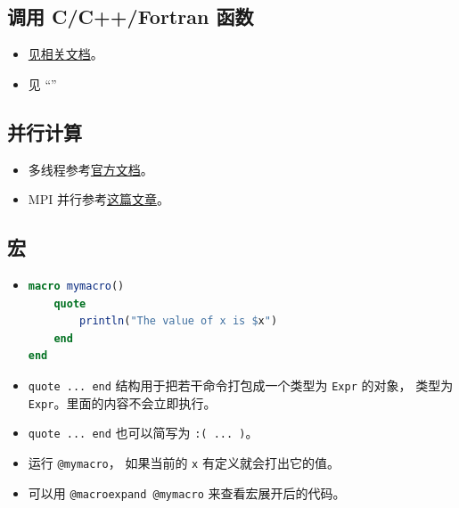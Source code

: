 \subsection{调用 C/C++/Fortran 函数}
\begin{itemize}
\item \href{https://docs.julialang.org/en/v1/manual/calling-c-and-fortran-code/}{见相关文档}。
\item 见 “”
\end{itemize}

\subsection{并行计算}
\begin{itemize}
\item 多线程参考\href{https://docs.julialang.org/en/v1/manual/multi-threading/}{官方文档}。
\item MPI 并行参考\href{http://www.claudiobellei.com/2018/09/30/julia-mpi/}{这篇文章}。
\end{itemize}

\subsection{宏}
\begin{itemize}
\item 
\begin{lstlisting}[language=julia]
macro mymacro()
    quote
        println("The value of x is $x")
    end
end
\end{lstlisting}
\item \verb`quote ... end` 结构用于把若干命令打包成一个类型为 \verb`Expr` 的对象， 类型为 \verb`Expr`。里面的内容不会立即执行。
\item \verb`quote ... end` 也可以简写为 \verb`:( ... )`。
\item 运行 \verb`@mymacro`， 如果当前的 \verb`x` 有定义就会打出它的值。
\item 可以用 \verb`@macroexpand @mymacro` 来查看宏展开后的代码。
\end{itemize}
